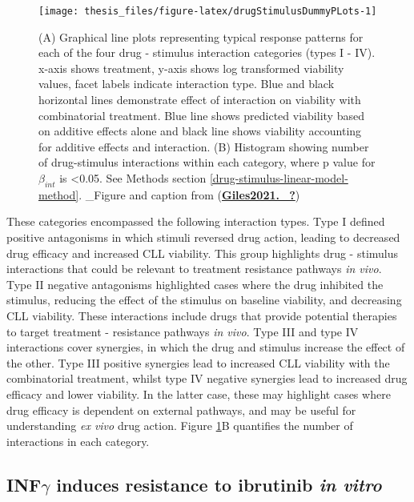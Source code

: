 \documentclass[11pt, a4paper, twosided]{book}
\begin{document}
\begin{figure}[H]

{\centering \texttt{[image: thesis\_files/figure-latex/drugStimulusDummyPLots-1]} 

}

\caption{(A) Graphical line plots representing typical response patterns for each of the four drug - stimulus interaction categories (types I - IV). x-axis shows treatment, y-axis shows log transformed viability values, facet labels indicate interaction type. Blue and black horizontal lines demonstrate effect of interaction on viability with combinatorial treatment. Blue line shows predicted viability based on additive effects alone and black line shows viability accounting for additive effects and interaction. (B) Histogram showing number of drug-stimulus interactions within each category, where p value for \(\beta_{int}\) is \textless0.05. See Methods section \ref{drug-stimulus-linear-model-method}. \_Figure and caption from (\protect\hyperlink{ref-Giles2021._}{\textbf{Giles2021.\_?}})}\label{fig:drugStimulusDummyPLots}
\end{figure}
These categories encompassed the following interaction types. Type I defined positive antagonisms in which stimuli reversed drug action, leading to decreased drug efficacy and increased CLL viability. This group highlights drug - stimulus interactions that could be relevant to treatment resistance pathways \emph{in vivo}. Type II negative antagonisms highlighted cases where the drug inhibited the stimulus, reducing the effect of the stimulus on baseline viability, and decreasing CLL viability. These interactions include drugs that provide potential therapies to target treatment - resistance pathways \emph{in vivo}. Type III and type IV interactions cover synergies, in which the drug and stimulus increase the effect of the other. Type III positive synergies lead to increased CLL viability with the combinatorial treatment, whilst type IV negative synergies lead to increased drug efficacy and lower viability. In the latter case, these may highlight cases where drug efficacy is dependent on external pathways, and may be useful for understanding \emph{ex vivo} drug action. Figure \ref{fig:drugStimulusDummyPLots}B quantifies the number of interactions in each category.

\hypertarget{drug-stimulus-interaction-examples}{%
\subsection{\texorpdfstring{INF\(\gamma\) induces resistance to ibrutinib \emph{in vitro}}{INF\textbackslash gamma induces resistance to ibrutinib in vitro}}\label{drug-stimulus-interaction-examples}}
\end{document}
